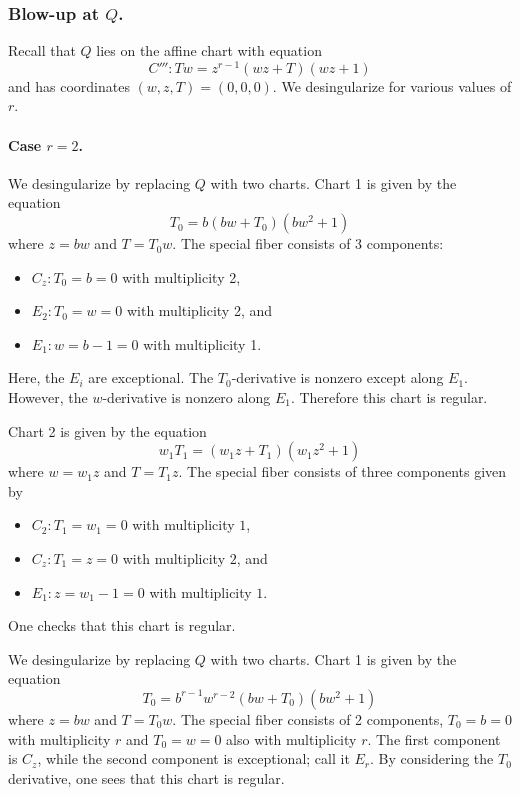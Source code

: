 \documentclass{article}
\theoremstyle{plain}
\theoremstyle{definition}
\theoremstyle{remark}
\begin{document}
\subsubsection{Blow-up at $Q$.}
\label{sec:blow-up-Q}

Recall that $Q$ lies on the affine chart with equation
\begin{equation}
  C''':Tw = z^{r-1}(wz + T)(wz + 1)\label{eq:C'''}
\end{equation}
and has coordinates $(w,z,T) = (0,0,0)$. We desingularize for various values of $r$.

\paragraph{Case $r = 2$.}
\label{sec:r=2}



We desingularize by replacing $Q$ with two charts. Chart 1 is given by the equation
\[
T_0 = b(bw + T_0)(bw^2 + 1)
\]
where $z = bw$ and $T = T_0w$. The special fiber consists of 3 components:
\begin{itemize}
    \item $C_z: T_0 = b = 0$ with multiplicity 2,
    \item $E_2: T_0 = w = 0$ with multiplicity 2, and
    \item $E_1: w = b-1 = 0$ with multiplicity 1.
\end{itemize}
Here, the $E_i$ are exceptional. The $T_0$-derivative is nonzero except along $E_1$. However, the $w$-derivative is nonzero along $E_1$. Therefore this chart is regular.

Chart 2 is given by the equation
\[
w_1 T_1 = (w_1z + T_1)(w_1 z^2 + 1)
\]
where $w = w_1 z$ and $T = T_1 z$. The special fiber consists of three components given by
\begin{itemize}
    \item $C_2: T_1 = w_1 = 0$ with multiplicity $1$,
    \item $C_z: T_1 = z = 0$ with multiplicity $2$, and
    \item $E_1: z = w_1-1 = 0$ with multiplicity $1$.
\end{itemize}
One checks that this chart is regular.



We desingularize by replacing $Q$ with two charts. Chart 1 is given by the equation
\[
T_0 = b^{r-1}w^{r-2}(bw + T_0)(bw^2 + 1)
\]
where $z = bw$ and $T = T_0w$. The special fiber consists of 2 components, $T_0 = b = 0$ with multiplicity $r$ and $T_0 = w = 0$ also with multiplicity $r$. The first component is $C_z$, while the second component is exceptional; call it $E_r$. By considering the $T_0$ derivative, one sees that this chart is regular.
\end{document}

